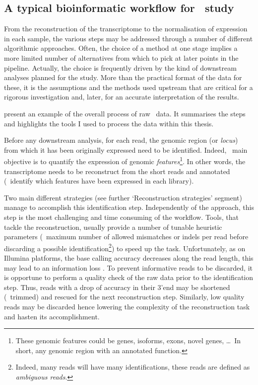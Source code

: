 \subsection{A typical bioinformatic workflow for \Rnaseq\ study}\label{sub;RNAseqworflow}

From the reconstruction of the
transcriptome to the normalisation of expression in each sample, the various
steps may be addressed through a number of different algorithmic approaches.
Often, the choice of a method at one stage implies a more limited number of
alternatives from which to pick at later points in the pipeline. Actually,
the choice is frequently driven by the kind of downstream analyses planned for
the study. More than the practical format of the data for these, it is the
assumptions and the methods used upstream that are critical for a
rigorous investigation and, later, for an accurate interpretation of the results.

 present an example of the overall 
process of raw \Rnaseq\ data. It summarises the steps and highlights the tools
I used to process the data within this thesis.

Before any downstream analysis, for each read, the genomic region (or
\emph{locus}) from which it has been originally expressed need to be identified.
Indeed, \Rnaseq\ main objective is to quantify the expression of genomic
\emph{features}\footnote{These genomic features could be genes, isoforms,
exons, novel genes, \dots\
In short, any genomic region with an annotated function.}. In other words,
the transcriptome needs to be reconstruct from the short reads and annotated
(\ie\ identify which features have been expressed in each library).

Two main different strategies (see further `Reconstruction strategies' segment)
manage to accomplish this identification step. Independently of the
approach, this step is the most challenging and time consuming
of the workflow. Tools, that tackle the reconstruction, usually provide a
number of tunable heuristic parameters (\eg\ maximum number of allowed mismatches
or indels per read before discarding a possible identification\footnote{Indeed,
many reads will have many identifications, these reads are defined as
\emph{ambiguous reads}.})
to speed up the task.
Unfortunately, as on Illumina platforms, the base calling accuracy decreases
along the read length, this may lead to an information loss .
To prevent informative reads to be discarded, it is opportune to perform a quality
check of the raw data prior to the identification step. Thus, reads with a drop of
accuracy in their 3'end may be shortened (\ie\ trimmed) and rescued for the next
reconstruction step. Similarly, low quality reads may be discarded hence
lowering the complexity
of the reconstruction task and hasten its accomplishment.

